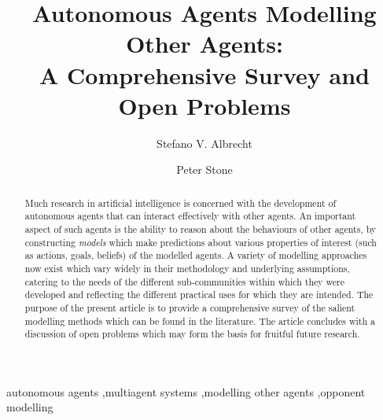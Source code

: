\documentclass[final,1p,times,authoryear]{elsarticle}
\begin{document}

	\begin{frontmatter}

		\title{Autonomous Agents Modelling Other Agents: \\ A Comprehensive Survey and Open Problems}

		\author[ed]{Stefano V. Albrecht}
		\address[ed]{The University of Edinburgh, United Kingdom}
		\author[ut]{Peter Stone}
		\address[ut]{The University of Texas at Austin, United States}

		\begin{abstract}
Much research in artificial intelligence is concerned with the development of autonomous agents that can interact effectively with other agents. An important aspect of such agents is the ability to reason about the behaviours of other agents, by constructing \emph{models} which make predictions about various properties of interest (such as actions, goals, beliefs) of the modelled agents. A variety of modelling approaches now exist which vary widely in their methodology and underlying assumptions, catering to the needs of the different sub-communities within which they were developed and reflecting the different practical uses for which they are intended. The purpose of the present article is to provide a comprehensive survey of the salient modelling methods which can be found in the literature. The article concludes with a discussion of open problems which may form the basis for fruitful future research.
		\end{abstract}

		\begin{keyword}
			autonomous agents \sep multiagent systems \sep modelling other agents \sep opponent modelling
		\end{keyword}

	\end{frontmatter}





	\tableofcontents
	\noindent\hrulefill


\end{document}
